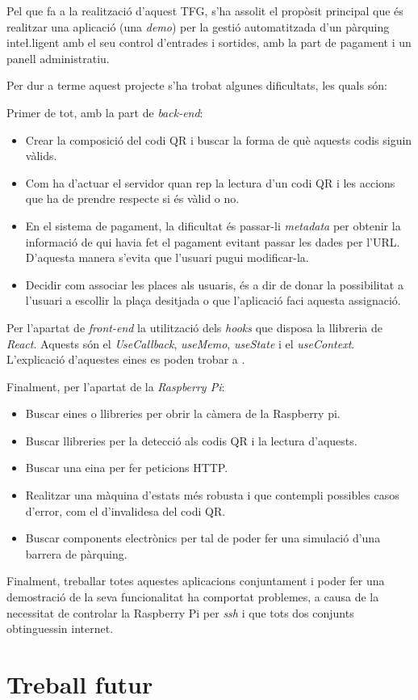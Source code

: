 Pel que fa a la realització d'aquest TFG, s'ha assolit el propòsit principal
que és realitzar una aplicació (una \emph{demo}) per la gestió automatitzada d'un pàrquing
inte\l.ligent amb el seu control d'entrades i sortides, amb la part de pagament i un panell administratiu.

Per dur a terme aquest projecte s'ha trobat algunes dificultats, les quals són:

Primer de tot, amb la part de \emph{back-end}:
\begin{itemize}
    \item Crear la composició del codi QR i buscar la forma de què aquests codis siguin vàlids.
    \item Com ha d'actuar el servidor quan rep la lectura d'un codi QR i les accions que ha de
    prendre respecte si és vàlid o no.
    \item En el sistema de pagament, la dificultat és passar-li \emph{metadata} per
    obtenir la informació de qui havia fet el pagament evitant passar les dades per l'URL. D'aquesta manera s'evita que
    l'usuari pugui modificar-la.
    \item Decidir com associar les places als usuaris, és a dir de donar la possibilitat a l'usuari a escollir la plaça
    desitjada o que l'aplicació faci aquesta assignació.
\end{itemize}

Per l'apartat de \emph{front-end} la utilització dels \emph{hooks} que disposa la llibreria
de \emph{React}. Aquests són el \emph{UseCallback}, \emph{useMemo}, \emph{useState} i el \emph{useContext}.
L'explicació d'aquestes eines es poden trobar a \autocite{hooks_react}.

Finalment, per l'apartat de la \emph{Raspberry Pi}:
\begin{itemize}
    \item Buscar eines o llibreries per obrir la càmera de la Raspberry pi.
    \item Buscar llibreries per la detecció als codis QR i la lectura d'aquests.
    \item Buscar una eina per fer peticions HTTP.
    \item Realitzar una màquina d'estats més robusta i que contempli possibles casos d'error, com el d'invalidesa del codi QR.
    \item Buscar components electrònics per tal de poder fer una simulació d'una barrera de pàrquing.
\end{itemize}

Finalment, treballar totes aquestes aplicacions conjuntament i poder fer una demostració de la seva funcionalitat
ha comportat problemes, a causa de la necessitat de controlar la Raspberry Pi per \emph{ssh} i que tots dos conjunts obtinguessin internet.

\section{Treball futur}


